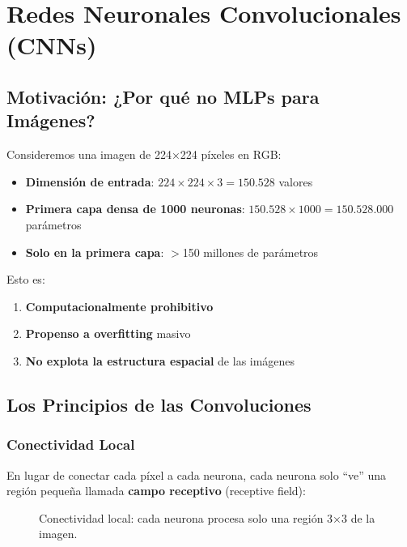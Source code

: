 \documentclass[12pt,a4paper]{article}
\begin{document}
\section{Redes Neuronales Convolucionales (CNNs)}

\subsection{Motivación: ¿Por qué no MLPs para Imágenes?}

Consideremos una imagen de 224×224 píxeles en RGB:

\begin{itemize}
    \item \textbf{Dimensión de entrada}: $224 \times 224 \times 3 = 150.528$ valores
    \item \textbf{Primera capa densa de 1000 neuronas}: $150.528 \times 1000 = 150.528.000$ parámetros
    \item \textbf{Solo en la primera capa}: $>$150 millones de parámetros
\end{itemize}

Esto es:
\begin{enumerate}
    \item \textbf{Computacionalmente prohibitivo}
    \item \textbf{Propenso a overfitting} masivo
    \item \textbf{No explota la estructura espacial} de las imágenes
\end{enumerate}

\subsection{Los Principios de las Convoluciones}

\subsubsection{Conectividad Local}

En lugar de conectar cada píxel a cada neurona, cada neurona solo ``ve'' una región pequeña llamada \textbf{campo receptivo} (receptive field):

\begin{figure}[H]
\centering
{}
\caption{Conectividad local: cada neurona procesa solo una región 3×3 de la imagen.}
\end{figure}
\end{document}
